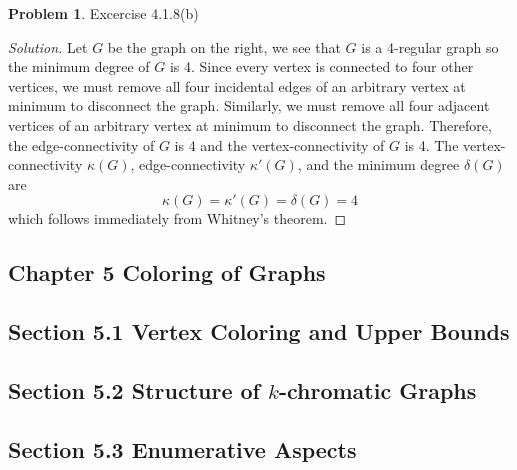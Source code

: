 \documentclass[12pt]{article}
\theoremstyle{definition}
\newtheorem{problem}{Problem}
\newenvironment*{solution}{\begin{proof}[Solution]}{\end{proof}}
\begin{document}
\begin{problem}
    Excercise 4.1.8(b)
\end{problem}
\begin{solution}
    Let \(G\) be the graph on the right, we see that \(G\) is a 4-regular graph so the minimum degree of \(G\) is 4.
    Since every vertex is connected to four other vertices, we must remove all four incidental edges of an arbitrary vertex at minimum to disconnect the graph.
    Similarly, we must remove all four adjacent vertices of an arbitrary vertex at minimum to disconnect the graph.
    Therefore, the edge-connectivity of \(G\) is 4 and the vertex-connectivity of \(G\) is 4.
    The vertex-connectivity \(\kappa(G)\), edge-connectivity \(\kappa'(G)\), and the minimum degree \(\delta(G)\) are
    \[\kappa(G) = \kappa'(G) = \delta(G) = 4\] which follows immediately from Whitney's theorem.
\end{solution}

\subsection*{Chapter 5 Coloring of Graphs}
\subsection*{Section 5.1 Vertex Coloring and Upper Bounds}
\subsection*{Section 5.2 Structure of \(k\)-chromatic Graphs}
\subsection*{Section 5.3 Enumerative Aspects}
\end{document}
